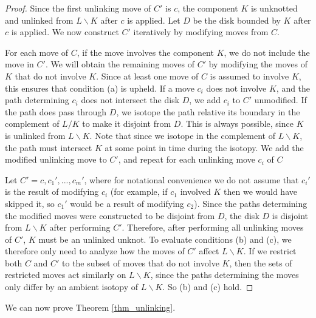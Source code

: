 \documentclass[12pt]{amsart}
\theoremstyle{definition}
\theoremstyle{remark}
\begin{document}
\begin{proof}
Since the first unlinking move of $C'$ is $c$, the component $K$ is unknotted and unlinked from $L\backslash K$ after $c$ is applied.
Let $D$ be the disk bounded by $K$ after $c$ is applied.
We now construct $C'$ iteratively by modifying moves from $C$.

For each move of $C$, if the move involves the component $K$, we do not include the move in $C'$.
We will obtain the remaining moves of $C'$ by modifying the moves of $K$ that do not involve $K$.
Since at least one move of $C$ is assumed to involve $K$, this ensures that condition (a) is upheld.
If a move $c_i$ does not involve $K$, and the path determining $c_i$ does not intersect the disk $D$, we add $c_i$ to $C'$ unmodified.
If the path does pass through $D$, we isotope the path relative its boundary in the complement of $L/K$ to make it disjoint from $D$.
This is always possible, since $K$ is unlinked from $L\backslash K$.
Note that since we isotope in the complement of $L\backslash K$, the path must intersect $K$ at some point in time during the isotopy.
We add the modified unlinking move to $C'$, and repeat for each unlinking move $c_i$ of $C$

Let $C' = c, c_1', ..., c_m'$, where for notational convenience we do not assume that $c_i'$ is the result of modifying $c_i$ (for example, if $c_1$ involved $K$ then we would have skipped it, so $c_1'$ would be a result of modifying $c_2$).
Since the paths determining the modified moves were constructed to be disjoint from $D$, the disk $D$ is disjoint from $L\backslash K$ after performing $C'$.
Therefore, after performing all unlinking moves of $C'$, $K$ must be an unlinked unknot.
To evaluate conditions (b) and (c), we therefore only need to analyze how the moves of $C'$ affect $L \backslash K$.
If we restrict both $C$ and $C'$ to the subset of moves that do not involve $K$, then the sets of restricted moves act similarly on $L\backslash K$, since the paths determining the moves only differ by an ambient isotopy of $L \backslash K$. So (b) and (c) hold.
\end{proof}

We can now prove Theorem \ref{thm_unlinking}.
\end{document}
